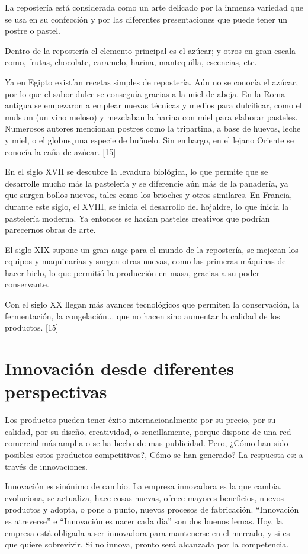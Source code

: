 \documentclass{bmcart}
\begin{document}
La repostería está considerada como un arte delicado por la inmensa variedad que se usa en su confección y por las diferentes presentaciones que puede tener un postre o pastel.

Dentro de la repostería el elemento principal es el azúcar; y otros en gran escala como, frutas, chocolate, caramelo, harina, mantequilla, escencias, etc.

Ya en Egipto existían recetas simples de repostería. Aún no se conocía el azúcar, por lo que el sabor dulce se conseguía gracias a la miel de abeja.
En la Roma antigua se empezaron a emplear nuevas técnicas y medios para dulcificar, como el mulsum (un vino meloso) y mezclaban la harina con miel para elaborar pasteles. Numerosos autores mencionan postres como la tripartina, a base de huevos, leche y miel, o el globus¸una especie de buñuelo. Sin embargo, en el lejano Oriente se conocía la caña de azúcar. [15]

En el siglo XVII se descubre la levadura biológica, lo que permite que se desarrolle mucho más la pastelería y se diferencie aún más de la panadería, ya que surgen bollos nuevos, tales como los brioches y otros similares.
En Francia, durante este siglo, el XVIII, se inicia el desarrollo del hojaldre, lo que inicia la pastelería moderna. Ya entonces se hacían pasteles creativos que podrían parecernos obras de arte. 

El siglo XIX supone un gran auge para el mundo de la repostería, se mejoran los equipos y maquinarias y surgen otras nuevas, como las primeras máquinas de hacer hielo, lo que permitió la producción en masa, gracias a su poder conservante.

Con el siglo XX llegan más avances tecnológicos que permiten la conservación, la fermentación, la congelación... que no hacen sino aumentar la calidad de los productos. [15]


\section{Innovación desde diferentes perspectivas}

Los productos pueden tener éxito internacionalmente por su precio, por su calidad, por su diseño, creatividad, o sencillamente, porque dispone de una red comercial más amplia o se ha hecho de mas publicidad. Pero, ¿Cómo han sido posibles estos productos competitivos?, Cómo se han generado? La respuesta es: a través de innovaciones.

Innovación es sinónimo de cambio. La empresa innovadora es la que cambia, evoluciona, se actualiza, hace cosas nuevas, ofrece mayores beneficios, nuevos productos y adopta, o pone a punto, nuevos procesos de fabricación. “Innovación es atreverse” e “Innovación es nacer cada día” son dos buenos lemas. Hoy, la empresa está obligada a ser innovadora para mantenerse en el mercado, y si es que quiere sobrevivir. Si no innova, pronto será alcanzada por la competencia.
\end{document}
